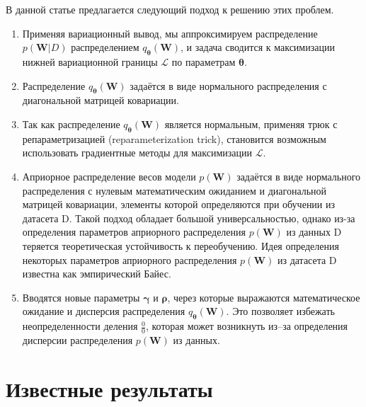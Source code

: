 \documentclass{article}
\numberwithin{equation}{section}
\begin{document}
    В данной статье предлагается следующий подход к решению этих проблем.

    \begin{enumerate}
        \item Применяя вариационный вывод,
            мы аппроксимируем распределение $p(\pmb{W}| D)$
            распределением $q_{\pmb{\theta}}(\pmb{W})$,
            и задача сводится к максимизации нижней вариационной границы
            $\mathcal{L}$ по параметрам $\pmb{\theta}$.
        \item Распределение $q_{\pmb{\theta}}(\pmb{W})$
            задаётся в виде нормального распределения с диагональной матрицей ковариации.
        \item Так как распределение $q_{\pmb{\theta}}(\pmb{W})$
            является нормальным, применяя трюк с репараметризацией
            (reparameterization trick),
            становится возможным использовать градиентные методы
            для максимизации $\mathcal{L}$.
        \item Априорное распределение весов модели $p(\pmb{W})$
            задаётся в виде нормального распределения с нулевым математическим ожиданием
            и диагональной матрицей ковариации,
            элементы которой определяются при обучении из датасета D.
            Такой подход обладает большой универсальностью,
            однако из-за определения параметров априорного распределения $p(\pmb{W})$
            из данных D теряется теоретическая устойчивость к переобучению.
            Идея определения некоторых параметров априорного распределения
            $p(\pmb{W})$ из датасета D
            известна как эмпирический Байес.
        \item Вводятся новые параметры $\pmb{\gamma}$ и $\pmb{\rho}$,
            через которые выражаются математическое ожидание и дисперсия распределения
            $q_{\pmb{\theta}}(\pmb{W})$.
            Это позволяет избежать неопределенности деления $\frac{0}{0}$,
            которая может возникнуть из--за определения дисперсии распределения $p(\pmb{W})$ из данных.
    \end{enumerate}

    \section{Известные результаты}
\end{document}
